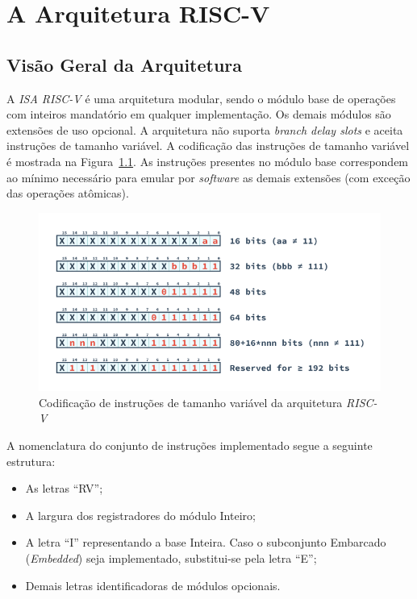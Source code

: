 \chapter{A Arquitetura RISC-V}\label{cap_arquitetura}

\section{Visão Geral da Arquitetura}
{
    A \textit{ISA RISC-V} é uma arquitetura modular, sendo o módulo base de
    operações com inteiros mandatório em qualquer implementação. Os demais
    módulos são extensões de uso opcional. A arquitetura não suporta
    \textit{branch delay slots} e aceita instruções de tamanho variável. A
    codificação das instruções de tamanho variável é mostrada na
    Figura~\ref{fig:riscv_var_length}. As instruções presentes no módulo
    base correspondem ao mínimo necessário para emular por
    \textit{software} as demais extensões (com exceção das operações
    atômicas).
}

\begin{figure}[H]
\centering
    \includegraphics[width=1\linewidth]{../images/RV_InstructionLength.png}
    \caption{Codificação de instruções de tamanho variável da arquitetura
                \textit{RISC-V}}\label{fig:riscv_var_length}
\end{figure}

\clearpage

{
    A nomenclatura do conjunto de instruções implementado segue a
    seguinte estrutura:
}

\begin{itemize}[leftmargin=20mm]
    \item {As letras ``RV'';}
    \item {A largura dos registradores do módulo Inteiro;}
    \item {A letra ``I'' representando a base Inteira. Caso o subconjunto
            Embarcado (\textit{Embedded}) seja implementado, substitui-se
            pela letra ``E'';}
    \item {Demais letras identificadoras de módulos opcionais.}
\end{itemize}

